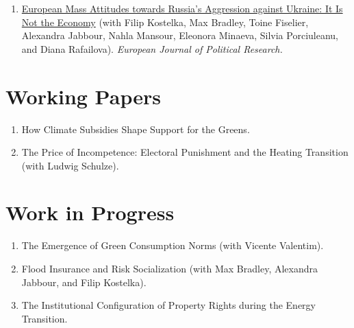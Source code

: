 \documentclass[11pt,letterpaper]{article}
\begin{document}
\begin{enumerate}
  \item \href{https://www.researchgate.net/publication/403049733_Mass_Attitudes_towards_Russia's_Aggression_against_Ukraine_Tentative_Support_for_Top-Down_Opinion_Formation}{European Mass Attitudes towards Russia's Aggression against Ukraine: It Is Not the Economy}
  {\color{muted}(with Filip Kostelka, Max Bradley, Toine Fiselier, Alexandra Jabbour, Nahla Mansour, Eleonora Minaeva, Silvia Porciuleanu, and Diana Rafailova).}
  {\color{muted}\emph{European Journal of Political Research.}}
\end{enumerate}


\section{Working Papers}

\begin{enumerate}
  \item How Climate Subsidies Shape Support for the Greens.
  \item The Price of Incompetence: Electoral Punishment and the Heating Transition {\color{muted}(with Ludwig Schulze)}.
\end{enumerate}


\section{Work in Progress}

\begin{enumerate}
  \item The Emergence of Green Consumption Norms {\color{muted}(with Vicente Valentim)}.
  \item Flood Insurance and Risk Socialization {\color{muted}(with Max Bradley, Alexandra Jabbour, and Filip Kostelka)}.
  \item The Institutional Configuration of Property Rights during the Energy Transition.
\end{enumerate}
\end{document}
